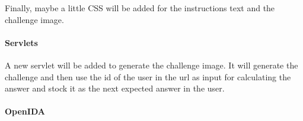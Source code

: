 \documentclass[11pt,a4paper]{article}
\begin{document}
Finally, maybe a little CSS will be added for the instructions text and the challenge image.

\paragraph{Servlets}
A new servlet will be added to generate the challenge image. It will generate the challenge and then use the id of the user in the url as input for
calculating the answer and stock it as the next expected answer in the user.

\paragraph{OpenIDA}
\end{document}
